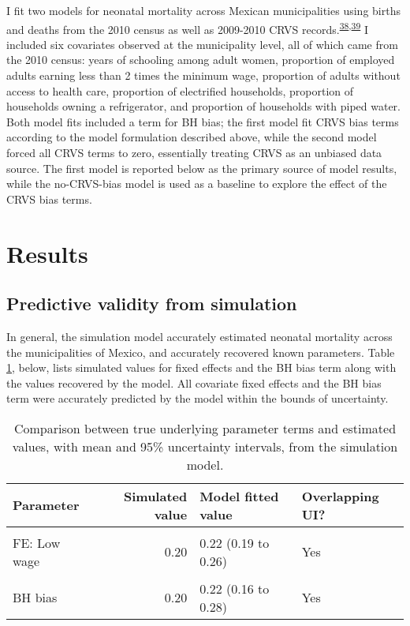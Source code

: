 \documentclass[
]{article}
\begin{document}
I fit two models for neonatal mortality across Mexican municipalities using births and deaths from the 2010 census as well as 2009-2010 CRVS records.\textsuperscript{\protect\hyperlink{ref-INEGI2010}{38},\protect\hyperlink{ref-INEGI2010a}{39}} I included six covariates observed at the municipality level, all of which came from the 2010 census: years of schooling among adult women, proportion of employed adults earning less than 2 times the minimum wage, proportion of adults without access to health care, proportion of electrified households, proportion of households owning a refrigerator, and proportion of households with piped water. Both model fits included a term for BH bias; the first model fit CRVS bias terms according to the model formulation described above, while the second model forced all CRVS terms to zero, essentially treating CRVS as an unbiased data source. The first model is reported below as the primary source of model results, while the no-CRVS-bias model is used as a baseline to explore the effect of the CRVS bias terms.

\hypertarget{results}{%
\section{Results}\label{results}}

\hypertarget{predictive-validity-from-simulation}{%
\subsection{Predictive validity from simulation}\label{predictive-validity-from-simulation}}

In general, the simulation model accurately estimated neonatal mortality across the municipalities of Mexico, and accurately recovered known parameters. Table \ref{tab:sim-param-results}, below, lists simulated values for fixed effects and the BH bias term along with the values recovered by the model. All covariate fixed effects and the BH bias term were accurately predicted by the model within the bounds of uncertainty.

\begin{table}[!h]

\caption{\label{tab:sim-param-results}Comparison between true underlying parameter terms and estimated values, with mean and 95\% uncertainty intervals, from the simulation model.}
\centering
\begin{tabular}[t]{lrll}
\toprule
Parameter & Simulated value & Model fitted value & Overlapping UI?\\
\midrule
\cellcolor{gray!6}{FE: Years of school} & \cellcolor{gray!6}{-0.25} & \cellcolor{gray!6}{-0.24 (-0.28 to -0.21)} & \cellcolor{gray!6}{Yes}\\
FE: Low wage & 0.20 & 0.22 (0.19 to 0.26) & Yes\\
\cellcolor{gray!6}{FE: No health care} & \cellcolor{gray!6}{0.50} & \cellcolor{gray!6}{0.48 (0.46 to 0.51)} & \cellcolor{gray!6}{Yes}\\
BH bias & 0.20 & 0.22 (0.16 to 0.28) & Yes\\
\bottomrule
\end{tabular}
\end{table}
\end{document}
